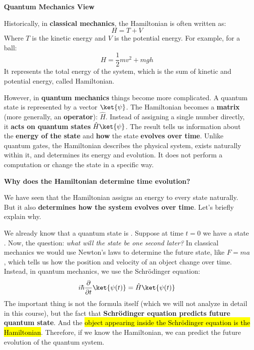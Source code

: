 \highspace
\begin{flushleft}
    \textcolor{Green3}{ \textbf{Quantum Mechanics View}}
\end{flushleft}
Historically, in \textbf{classical mechanics}, the Hamiltonian is often written as:
\begin{equation*}
    H = T + V
\end{equation*}
Where $T$ is the kinetic energy and $V$ is the potential energy. For example, for a ball:
\begin{equation*}
    H = \frac{1}{2} mv^{2} + mgh
\end{equation*}
It represents the total energy of the system, which is the sum of kinetic and potential energy, called Hamiltonian.

\highspace
However, in \textbf{quantum mechanics} things become more complicated. A quantum state is represented by a vector $\ket{\psi}$. The Hamiltonian becomes a \textbf{matrix} (more generally, an \textbf{operator}): $\hat{H}$. Instead of assigning a single number directly, it \textbf{acts on quantum states} $\hat{H}\ket{\psi}$. The result tells us information about the \textbf{energy of the state} and \textbf{how} the state \textbf{evolves over time}. Unlike quantum gates, the Hamiltonian describes the physical system, exists naturally within it, and determines its energy and evolution. It does not perform a computation or change the state in a specific way.

\highspace
\begin{flushleft}
    \textcolor{Green3}{ \textbf{Why does the Hamiltonian determine time evolution?}}
\end{flushleft}
We have seen that the Hamiltonian assigns an energy to every state naturally. But it also \textbf{determines how the system evolves over time}. Let's briefly explain why.

\highspace
We already know that a quantum state is \ket{\psi}. Suppose at time $t=0$ we have a state . Now, the question: \emph{what will the state be one second later?} In classical mechanics we would use Newton's laws to determine the future state, like $F = ma$, which tells us how the position and velocity of an object change over time. Instead, in quantum mechanics, we use the Schrödinger equation:
\begin{equation}
    i\hbar \frac{\partial}{\partial t} \ket{\psi(t)} = \hat{H} \ket{\psi(t)}
\end{equation}
The important thing is not the formula itself (which we will not analyze in detail in this course), but the fact that \textbf{Schrödinger equation predicts future quantum state}. And the \hl{object appearing inside the Schrödinger equation is the Hamiltonian}. Therefore, if we know the Hamiltonian, we can predict the future evolution of the quantum system.

